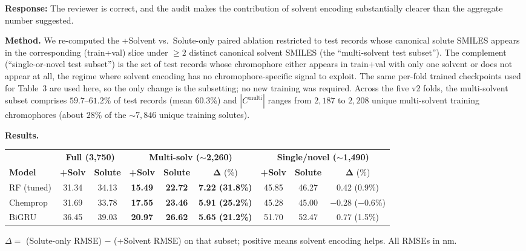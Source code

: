 \documentclass[11pt]{article}
\newcommand{\response}[1]{\noindent\textbf{Response:} #1\par\medskip}
\begin{document}
\response{The reviewer is correct, and the audit makes the contribution of solvent encoding substantially clearer than the aggregate number suggested.

\textbf{Method.} We re-computed the +Solvent vs.\ Solute-only paired ablation restricted to test records whose canonical solute SMILES appears in the corresponding (train+val) slice under $\geq 2$ distinct canonical solvent SMILES (the ``multi-solvent test subset''). The complement (``single-or-novel test subset'') is the set of test records whose chromophore either appears in train+val with only one solvent or does not appear at all, the regime where solvent encoding has no chromophore-specific signal to exploit. The same per-fold trained checkpoints used for Table~3 are used here, so the only change is the subsetting; no new training was required. Across the five v2 folds, the multi-solvent subset comprises $59.7$--$61.2$\% of test records (mean $60.3$\%) and $|C^{\text{multi}}|$ ranges from $2{,}187$ to $2{,}208$ unique multi-solvent training chromophores (about $28$\% of the $\sim$$7{,}846$ unique training solutes).

\textbf{Results.}

\begin{center}\small
\begin{tabular}{lcccccccc}
\toprule
& \multicolumn{2}{c}{\textbf{Full (3{,}750)}} & \multicolumn{3}{c}{\textbf{Multi-solv ($\sim$2{,}260)}} & \multicolumn{3}{c}{\textbf{Single/novel ($\sim$1{,}490)}} \\
\cmidrule(lr){2-3} \cmidrule(lr){4-6} \cmidrule(lr){7-9}
\textbf{Model} & \textbf{+Solv} & \textbf{Solute} & \textbf{+Solv} & \textbf{Solute} & $\boldsymbol{\Delta}$ (\%) & \textbf{+Solv} & \textbf{Solute} & $\boldsymbol{\Delta}$ (\%) \\
\midrule
RF (tuned) & 31.34 & 34.13 & \textbf{15.49} & \textbf{22.72} & \textbf{7.22 (31.8\%)} & 45.85 & 46.27 & 0.42 (0.9\%) \\
Chemprop   & 31.69 & 33.78 & \textbf{17.55} & \textbf{23.46} & \textbf{5.91 (25.2\%)} & 45.28 & 45.00 & $-0.28$ ($-0.6$\%) \\
BiGRU      & 36.45 & 39.03 & \textbf{20.97} & \textbf{26.62} & \textbf{5.65 (21.2\%)} & 51.70 & 52.47 & 0.77 (1.5\%) \\
\bottomrule
\end{tabular}
\end{center}

\noindent
$\Delta = $ (Solute-only RMSE) $-$ (+Solvent RMSE) on that subset; positive means solvent encoding helps. All RMSEs in nm.

}
\end{document}
